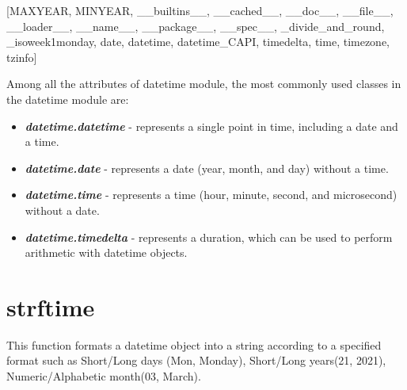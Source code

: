 \documentclass[11pt]{article}
\newenvironment{Shaded}{}{}
\newcommand{\NormalTok}[1]{{#1}}
\begin{document}
\begin{Shaded}
\begin{Highlighting}[]
\NormalTok{[\textquotesingle{}MAXYEAR\textquotesingle{}, \textquotesingle{}MINYEAR\textquotesingle{}, 
    \textquotesingle{}\_\_builtins\_\_\textquotesingle{}, \textquotesingle{}\_\_cached\_\_\textquotesingle{}, 
    \textquotesingle{}\_\_doc\_\_\textquotesingle{}, \textquotesingle{}\_\_file\_\_\textquotesingle{}, 
    \textquotesingle{}\_\_loader\_\_\textquotesingle{}, \textquotesingle{}\_\_name\_\_\textquotesingle{}, 
    \textquotesingle{}\_\_package\_\_\textquotesingle{}, \textquotesingle{}\_\_spec\_\_\textquotesingle{}, 
    \textquotesingle{}\_divide\_and\_round\textquotesingle{}, \textquotesingle{}\_isoweek1monday\textquotesingle{}, 
    \textquotesingle{}date\textquotesingle{}, \textquotesingle{}datetime\textquotesingle{}, 
    \textquotesingle{}datetime\_CAPI\textquotesingle{}, \textquotesingle{}timedelta\textquotesingle{}, 
    \textquotesingle{}time\textquotesingle{}, \textquotesingle{}timezone\textquotesingle{}, 
    \textquotesingle{}tzinfo\textquotesingle{}]}
\end{Highlighting}
\end{Shaded}

Among all the attributes of datetime module, the most commonly used classes in the datetime module are:

\begin{itemize}
\item \textbf{\emph{datetime.datetime}} - represents a single point in time, including a date and a time.
\item \textbf{\emph{datetime.date}} - represents a date (year, month, and day) without a time.
\item \textbf{\emph{datetime.time}} - represents a time (hour, minute, second, and microsecond) without a date.
\item \textbf{\emph{datetime.timedelta}} - represents a duration, which can be used to perform arithmetic with datetime objects.
\end{itemize}

\section{strftime}

This function formats a datetime object into a string according to a
specified format such as Short/Long days (Mon, Monday), Short/Long
years(21, 2021), Numeric/Alphabetic month(03, March).
\end{document}
